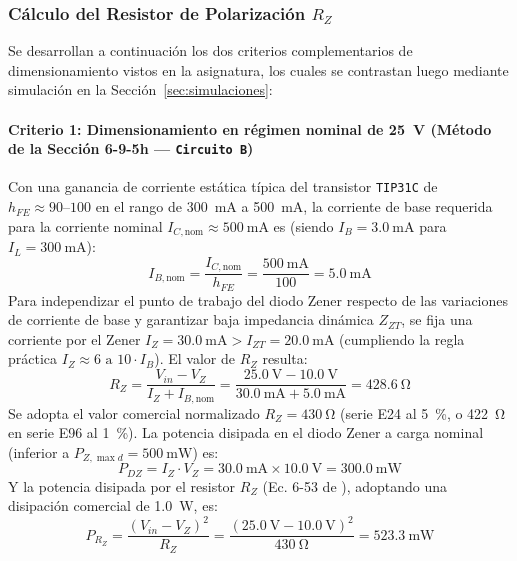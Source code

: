 \subsubsection{Cálculo del Resistor de Polarización $R_Z$}
Se desarrollan a continuación los dos criterios complementarios de dimensionamiento vistos en la asignatura, los cuales se contrastan luego mediante simulación en la Sección~\ref{sec:simulaciones}:

\paragraph{Criterio 1: Dimensionamiento en régimen nominal de \SI{25}{\volt} (Método de la Sección 6-9-5h \cite{gonzalez_p3} --- \texttt{Circuito B})}
Con una ganancia de corriente estática típica del transistor \texttt{TIP31C} de $h_{FE} \approx 90\text{--}100$ en el rango de \SI{300}{\milli\ampere} a \SI{500}{\milli\ampere}, la corriente de base requerida para la corriente nominal $I_{C,\text{nom}} \approx \SI{500}{\milli\ampere}$ es (siendo $I_B = \SI{3,0}{\milli\ampere}$ para $I_L = \SI{300}{\milli\ampere}$):
\begin{equation}
    I_{B,\text{nom}} = \frac{I_{C,\text{nom}}}{h_{FE}} = \frac{\SI{500}{\milli\ampere}}{100} = \SI{5,0}{\milli\ampere}
    \label{eq:ib_nom}
\end{equation}
Para independizar el punto de trabajo del diodo Zener respecto de las variaciones de corriente de base y garantizar baja impedancia dinámica $Z_{ZT}$, se fija una corriente por el Zener $I_Z = \SI{30,0}{\milli\ampere} > I_{ZT} = \SI{20,0}{\milli\ampere}$ (cumpliendo la regla práctica $I_Z \approx 6\text{ a }10 \cdot I_B$). El valor de $R_Z$ resulta:
\begin{equation}
    R_Z = \frac{V_{in} - V_Z}{I_Z + I_{B,\text{nom}}} = \frac{\SI{25,0}{\volt} - \SI{10,0}{\volt}}{\SI{30,0}{\milli\ampere} + \SI{5,0}{\milli\ampere}} = \SI{428,6}{\ohm}
    \label{eq:rz_criterio1}
\end{equation}
Se adopta el valor comercial normalizado \textbf{$R_Z = \SI{430}{\ohm}$} (serie E24 al \SI{5}{\percent}, o \SI{422}{\ohm} en serie E96 al \SI{1}{\percent}). La potencia disipada en el diodo Zener a carga nominal (inferior a $P_{Z,\max d} = \SI{500}{\milli\watt}$) es:
\begin{equation}
    P_{DZ} = I_Z \cdot V_Z = \SI{30,0}{\milli\ampere} \times \SI{10,0}{\volt} = \SI{300,0}{\milli\watt}
    \label{eq:pdz_criterio1}
\end{equation}
Y la potencia disipada por el resistor $R_Z$ (Ec. 6-53 de \cite{gonzalez_p2}), adoptando una disipación comercial de \SI{1,0}{\watt}, es:
\begin{equation}
    P_{R_Z} = \frac{\left(V_{in} - V_Z\right)^2}{R_Z} = \frac{\left(\SI{25,0}{\volt} - \SI{10,0}{\volt}\right)^2}{\SI{430}{\ohm}} = \SI{523,3}{\milli\watt}
    \label{eq:prz_criterio1}
\end{equation}

